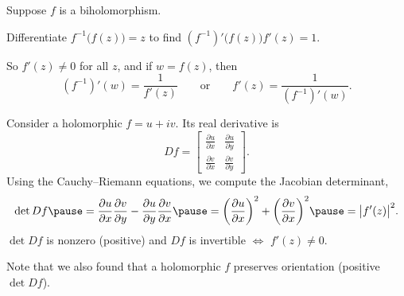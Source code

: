 \documentclass[10pt,aspectratio=169]{beamer}
\begin{document}
\begin{frame}
Suppose $f$ is a biholomorphism.

\pause
\medskip

Differentiate
$f^{-1}\bigl(f(z)\bigr) = z$ to find $(f^{-1})' \bigl(f(z)\bigr) f'(z) = 1$.

\pause
\medskip

So $f'(z) \not= 0$ for all $z$, \pause and
if $w = f(z)$, then
\[
(f^{-1})'(w) = \frac{1}{f'(z)}
\qquad \text{or} \qquad
f'(z) =
\frac{1}{(f^{-1})'(w)} .
\]

\medskip
\pause

Consider a holomorphic 
$f = u+iv$.  \pause Its real derivative is
\[
Df =
\begin{bmatrix}
\frac{\partial u}{\partial x} & \frac{\partial u}{\partial y} \\[5pt]
\frac{\partial v}{\partial x} & \frac{\partial v}{\partial y}
\end{bmatrix} .
\]
\pause
Using the Cauchy--Riemann equations, we compute the Jacobian determinant,
\[
\det Df \pause
=
\frac{\partial u}{\partial x}
\frac{\partial v}{\partial y} -
\frac{\partial u}{\partial y} 
\frac{\partial v}{\partial x}
\pause
=
{\left(\frac{\partial u}{\partial x}\right)}^2
+
{\left(\frac{\partial v}{\partial x}\right)}^2
\pause
=
\babs{f'(z)}^2 .
\]
\pause
$\det Df$ is nonzero (positive) and $Df$ is invertible $\Leftrightarrow$
$f'(z) \not= 0$.

\medskip
\pause

Note that we also found that a holomorphic $f$ preserves
orientation (positive $\det Df$).
\end{frame}
\end{document}

